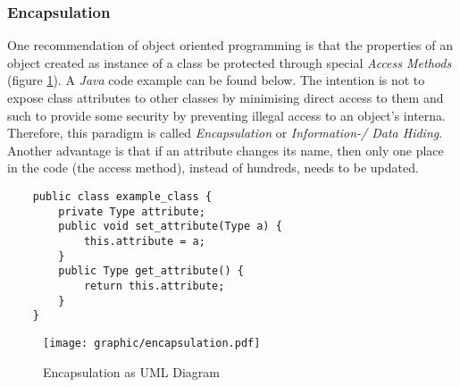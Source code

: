 %
%
%
%
%
%
%

\subsubsection{Encapsulation}
\label{encapsulation_heading}

One recommendation of object oriented programming is that the properties of an
object created as instance of a class be protected through special
\emph{Access Methods} (figure \ref{encapsulation_figure}). A \emph{Java} code
example can be found below. The intention is not to expose class attributes to
other classes by minimising direct access to them and such to provide some
security by preventing illegal access to an object's interna. Therefore, this
paradigm is called \emph{Encapsulation} or \emph{Information-/ Data Hiding}.
Another advantage is that if an attribute changes its name, then only one place
in the code (the access method), instead of hundreds, needs to be updated.

\begin{scriptsize}
    \begin{verbatim}
    public class example_class {
        private Type attribute;
        public void set_attribute(Type a) {
            this.attribute = a;
        }
        public Type get_attribute() {
            return this.attribute;
        }
    }
    \end{verbatim}
\end{scriptsize}

\begin{figure}[ht]
    \begin{center}
        \texttt{[image: graphic/encapsulation.pdf]}
        \caption{Encapsulation as UML Diagram}
        \label{encapsulation_figure}
    \end{center}
\end{figure}


